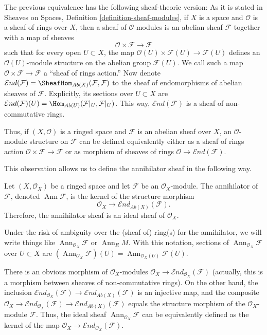 \medskip\noindent
The previous equivalence has the following sheaf-theoric version:
As it is stated in Sheaves on Spaces,
Definition \ref{definition-sheaf-modules},
if $X$ is a space and $\mathcal{O}$ is a sheaf of rings over $X$,
then a sheaf of $\mathcal{O}$-modules is an abelian sheaf
$\mathcal{F}$ together with a map of sheaves
$$
\mathcal{O}\times\mathcal{F}\to\mathcal{F}
$$
such that for every open $U\subset X$,
the map $\mathcal{O}(U)\times\mathcal{F}(U)\to\mathcal{F}(U)$
defines an $\mathcal{O}(U)$-module structure on the abelian group
$\mathcal{F}(U)$. We call such a map
$\mathcal{O}\times\mathcal{F}\to\mathcal{F}$ a ``sheaf of rings action.''
Now denote
$\mathcal{E}nd(\mathcal{F})
=\SheafHom_{Ab(X)}(\mathcal{F},\mathcal{F})$
to the sheaf of endomorphisms of abelian sheaves of $\mathcal{F}$.
Explicitly, its sections over $U\subset X$ are
$\mathcal{E}nd(\mathcal{F})(U)
=\Hom_{Ab(U)}(\mathcal{F}|_U,\mathcal{F}|_U)$.
This way,
$\mathcal{E}nd(\mathcal{F})$ is a sheaf of non-commutative rings.

\medskip\noindent
Thus, if $(X,\mathcal{O})$ is a ringed space and $\mathcal{F}$
is an abelian sheaf over $X$, an $\mathcal{O}$-module structure on
$\mathcal{F}$ can be defined equivalently either as a sheaf of rings
action $\mathcal{O}\times\mathcal{F}\to\mathcal{F}$
or as morphism of sheaves of rings
$\mathcal{O}\to\mathcal{E}nd(\mathcal{F})$.

\medskip\noindent
This observation allows us to define the annihilator sheaf in the following way.
\begin{definition}
	Let $(X,\mathcal{O}_X)$ be a ringed space and let $\mathcal{F}$
	be an $\mathcal{O}_X$-module.
	The annihilator of $\mathcal{F}$,
	denoted $\operatorname{Ann}\mathcal{F}$,
	is the kernel of the structure morphism
	$$
	\mathcal{O}_X\to\mathcal{E}nd_{Ab(X)}(\mathcal{F}).
	$$
	Therefore, the annihilator sheaf is an
	ideal sheaf of $\mathcal{O}_{X}$.
\end{definition}
Under the risk of ambiguity over the (sheaf of) ring(s) for the
annihilator, we will write things like
$\operatorname{Ann}_{\mathcal{O}_X}\mathcal{F}$
or $\operatorname{Ann}_R M$. With this notation, sections of
$\operatorname{Ann}_{\mathcal{O}_X}\mathcal{F}$ over $U\subset X$ are
$(\operatorname{Ann}_{\mathcal{O}_X}\mathcal{F})(U)
=\operatorname{Ann}_{\mathcal{O}_X(U)}\mathcal{F}(U)$.

\medskip\noindent
There is an obvious morphism of $\mathcal{O}_X$-modules
$\mathcal{O}_X\to\mathcal{E}nd_{\mathcal{O}_X}(\mathcal{F})$
(actually, this is a morphism between sheaves of non-commutative rings).
On the other hand, the inclusion
$\mathcal{E}nd_{\mathcal{O}_X}(\mathcal{F})
\to\mathcal{E}nd_{Ab(X)}(\mathcal{F})$ is an injective map,
and the composite
$\mathcal{O}_X\to
\mathcal{E}nd_{\mathcal{O}_X}(\mathcal{F})\to
\mathcal{E}nd_{Ab(X)}(\mathcal{F})$
equals the structure morphism of the $\mathcal{O}_X$-module $\mathcal{F}$.
Thus, the ideal sheaf $\operatorname{Ann}_{\mathcal{O}_X}\mathcal{F}$
can be equivalently defined as the kernel of the map
$\mathcal{O}_X\to
\mathcal{E}nd_{\mathcal{O}_X}(\mathcal{F})$.

